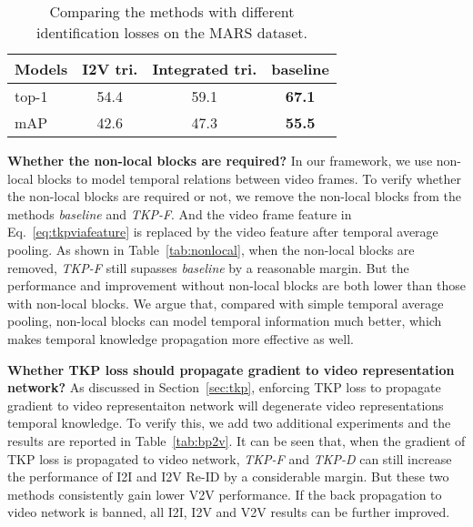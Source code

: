 \documentclass[10pt,twocolumn,letterpaper]{article}
\begin{document}
\begin{table}[t]
	\centering
	\small
	\caption{Comparing the methods with different identification losses on the MARS dataset.}
	\vspace{-20pt}
	\begin{center}{
			\setlength{\tabcolsep}{1mm}
			\begin{tabular}{l |c c c}
				\hline
				Models    &I2V tri.  &Integrated tri. &baseline\\
				\hline
				top-1   &54.4 &59.1 &\bfseries67.1\\
				mAP     &42.6 &47.3 &\bfseries55.5\\
				\hline
		    \end{tabular}}
	\end{center}
	\vspace{-15pt}
	\label{tab:losses}
\end{table}

\noindent
{\bf Whether the non-local blocks are required?} 
In our framework, we use non-local blocks to model temporal relations between video frames.
To verify whether the non-local blocks are required or not, we remove the non-local blocks from the methods \textit{baseline} and \textit{TKP-F}.
And the video frame feature  in Eq.~\eqref{eq:tkpviafeature} is replaced by the video feature  after temporal average pooling.
As shown in Table~\ref{tab:nonlocal}, when the non-local blocks are removed, \textit{TKP-F} still supasses \textit{baseline} by a reasonable margin.
But the performance and improvement without non-local blocks are both lower than those with non-local blocks. 
We argue that, compared with simple temporal average pooling, non-local blocks can model temporal information much better, which makes temporal knowledge propagation more effective as well.

\vspace{5pt}
\noindent
{\bf Whether TKP loss should propagate gradient to video representation network?}
As discussed in Section~\ref{sec:tkp}, enforcing TKP loss to propagate gradient to video representaiton network will degenerate video representations \wrt temporal knowledge.
To verify this, we add two additional experiments and the results are reported in Table~\ref{tab:bp2v}.
It can be seen that, when the gradient of TKP loss is propagated to video network, \textit{TKP-F} and \textit{TKP-D} can still increase the performance of I2I and I2V Re-ID by a considerable margin.
But these two methods consistently gain lower V2V performance.
If the back propagation to video network is banned, all I2I, I2V and V2V results can be further improved.
\end{document}
